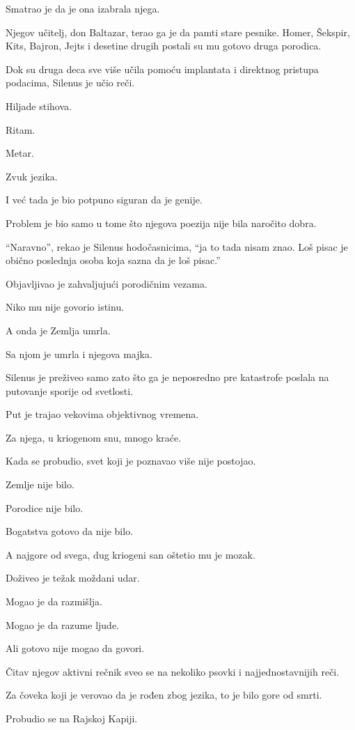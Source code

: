 Smatrao je da je ona izabrala njega.

Njegov učitelj, don Baltazar, terao ga je da pamti stare pesnike. Homer, Šekspir, Kits, Bajron, Jejts i desetine drugih postali su mu gotovo druga porodica.

Dok su druga deca sve više učila pomoću implantata i direktnog pristupa podacima, Silenus je učio reči.

Hiljade stihova.

Ritam.

Metar.

Zvuk jezika.

I već tada je bio potpuno siguran da je genije.

Problem je bio samo u tome što njegova poezija nije bila naročito dobra.

``Naravno'', rekao je Silenus hodočasnicima, ``ja to tada nisam znao. Loš pisac je obično poslednja osoba koja sazna da je loš pisac.''

Objavljivao je zahvaljujući porodičnim vezama.

Niko mu nije govorio istinu.

A onda je Zemlja umrla.

Sa njom je umrla i njegova majka.

Silenus je preživeo samo zato što ga je neposredno pre katastrofe poslala na putovanje sporije od svetlosti.

Put je trajao vekovima objektivnog vremena.

Za njega, u kriogenom snu, mnogo kraće.

Kada se probudio, svet koji je poznavao više nije postojao.

Zemlje nije bilo.

Porodice nije bilo.

Bogatstva gotovo da nije bilo.

A najgore od svega, dug kriogeni san oštetio mu je mozak.

Doživeo je težak moždani udar.

Mogao je da razmišlja.

Mogao je da razume ljude.

Ali gotovo nije mogao da govori.

Čitav njegov aktivni rečnik sveo se na nekoliko psovki i najjednostavnijih reči.

Za čoveka koji je verovao da je rođen zbog jezika, to je bilo gore od smrti.

\bigskip

Probudio se na Rajskoj Kapiji.

